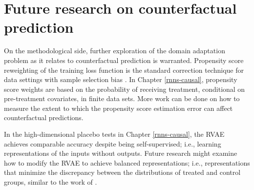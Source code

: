\section{Future research on counterfactual prediction}

On the methodological side, further exploration of the domain adaptation problem as it relates to counterfactual prediction is warranted. Propensity score reweighting of the training loss function is the standard correction technique for data settings with sample selection bias \citep{cortes2008sample}. In Chapter \ref{rnns-causal}, propensity score weights are based on the probability of receiving treatment, conditional on pre-treatment covariates, in finite data sets. More work can be done on how to measure the extent to which the propensity score estimation error can affect counterfactual predictions. 

In the high-dimensional placebo tests in Chapter \ref{rnns-causal}, the RVAE achieves comparable accuracy despite being self-supervised; i.e., learning representations of the inputs without outputs. Future research might examine how to modify the RVAE to achieve balanced representations; i.e., representations that minimize the discrepancy between the distributions of treated and control groups, similar to the work of \citet{johansson2016learning}.


